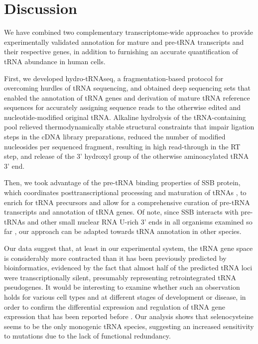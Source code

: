 \documentclass[12pt]{rockefeller}
\begin{document}
\section{Discussion}
We have combined two complementary transcriptome-wide approaches to provide experimentally validated annotation for mature and pre-tRNA transcripts and their respective genes, in addition to furnishing an accurate quantification of tRNA abundance in human cells.

First, we developed hydro-tRNAseq, a fragmentation-based protocol for overcoming hurdles of tRNA sequencing, and obtained deep sequencing sets that enabled the annotation of tRNA genes and derivation of mature tRNA reference sequences for accurately assigning sequence reads to the otherwise edited and nucleotide-modified original tRNA. Alkaline hydrolysis of the tRNA-containing pool relieved thermodynamically stable structural constraints that impair ligation steps in the cDNA library preparations, reduced the number of modified nucleosides per sequenced fragment, resulting in high read-through in the RT step, and release of the 3’ hydroxyl group of the otherwise aminoacylated tRNA 3’ end. 

Then, we took advantage of the pre-tRNA binding properties of SSB protein, which coordinates posttranscriptional processing and maturation of tRNAs \cite{Maraia:2010kx}, to enrich for tRNA precursors and allow for a comprehensive curation of pre-tRNA transcripts and annotation of tRNA genes. Of note, since SSB interacts with pre-tRNAs and other small nuclear RNA U-rich 3’ ends in all organisms examined so far \cite{Maraia:2006in,Teplova:2006dv}, our approach can be adapted towards tRNA annotation in other species.

Our data suggest that, at least in our experimental system, the tRNA gene space is considerably more contracted than it has been previously predicted by bioinformatics, evidenced by the fact that almost half of the predicted tRNA loci were transcriptionally silent, presumably representing retrointegrated tRNA pseudogenes. It would be interesting to examine whether such an observation holds for various cell types and at different stages of development or disease, in order to confirm the differential expression and regulation of tRNA gene expression that has been reported before \cite{Gingold:2014iz,Goodarzi:2016gd}. Our analysis shows that selenocysteine seems to be the only monogenic tRNA species, suggesting an increased sensitivity to mutations due to the lack of functional redundancy.
\end{document}
